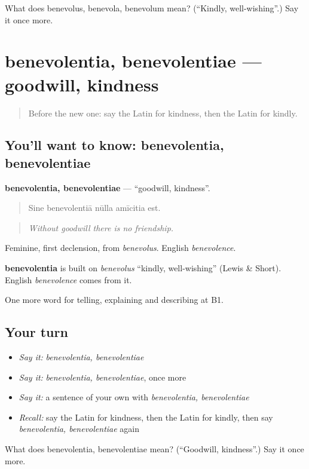 \begin{tcolorbox}[breakable,colback=teal!4,colframe=teal!35!black,title={Before you move on}]
What does benevolus, benevola, benevolum mean? (\textquotedblleft{}Kindly, well-wishing\textquotedblright{}.) Say it once more.
\end{tcolorbox}
\section[benevolentia, benevolentiae]{benevolentia, benevolentiae — goodwill, kindness}

\label{lesson:LA-C505-benevolentia}



\begin{quote}
Before the new one: say the Latin for kindness, then the Latin for kindly.
\end{quote}

\subsection*{You'll want to know: benevolentia, benevolentiae}
\textbf{benevolentia, benevolentiae} — \textquotedblleft{}goodwill, kindness\textquotedblright{}.

\begin{quote}
Sine benevolentiā nūlla amīcitia est.
\end{quote}

\begin{quote}
\emph{Without goodwill there is no friendship.}
\end{quote}

Feminine, first declension, from \emph{benevolus}. English \emph{benevolence}.

\begin{cousinweb}
\textbf{benevolentia} is built on \emph{benevolus} \textquotedblleft{}kindly, well-wishing\textquotedblright{} (Lewis \& Short). English \emph{benevolence} comes from it.
\end{cousinweb}

\begin{grammarlens}[title={What you've built}]
One more word for telling, explaining and describing at B1.
\end{grammarlens}

\subsection*{Your turn}
\begin{itemize}
\raggedright
  \item \emph{Say it:} \emph{benevolentia, benevolentiae}
  \item \emph{Say it:} \emph{benevolentia, benevolentiae}, once more
  \item \emph{Say it:} a sentence of your own with \emph{benevolentia, benevolentiae}
  \item \emph{Recall:} say the Latin for kindness, then the Latin for kindly, then say \emph{benevolentia, benevolentiae} again
\end{itemize}

\begin{tcolorbox}[breakable,colback=teal!4,colframe=teal!35!black,title={Before you move on}]
What does benevolentia, benevolentiae mean? (\textquotedblleft{}Goodwill, kindness\textquotedblright{}.) Say it once more.
\end{tcolorbox}
